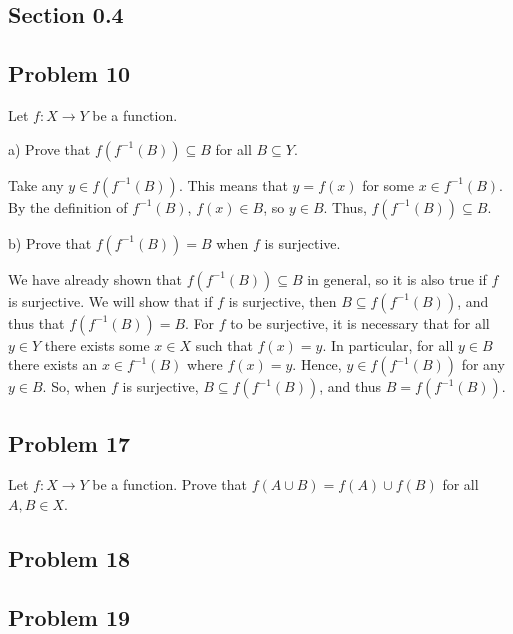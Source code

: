 \documentclass[11pt]{article}
\begin{document}
\subsection*{Section 0.4}
\subsection*{Problem 10}

Let $f: X \to Y$ be a function.

a) Prove that $f(f^{-1}(B)) \subseteq B$ for all $B \subseteq Y$.

Take any $y \in f(f^{-1}(B))$. This means that $y=f(x)$ for some $x \in f^{-1}(B)$.
By the definition of $f^{-1}(B)$, $f(x) \in B$, so $y \in B$. Thus,
$f(f^{-1}(B)) \subseteq B$. 

b) Prove that $f(f^{-1}(B)) = B$ when $f$ is surjective.

We have already shown that $f(f^{-1}(B)) \subseteq B$ in general, so it is also true
if $f$ is surjective. We will show that if $f$ is surjective, then 
$B \subseteq f(f^{-1}(B))$, and thus that $f(f^{-1}(B)) = B$. For $f$ to be surjective,
it is necessary that for all $y \in Y$ there exists some $x \in X$ such that $f(x) = y$.
In particular, for all $y \in B$ there exists an $x \in f^{-1}(B)$ where $f(x) = y$.
Hence, $y \in f(f^{-1}(B))$ for any $y \in B$. So, when $f$ is surjective,
$B \subseteq f(f^{-1}(B))$, and thus $B = f(f^{-1}(B))$.

\subsection*{Problem 17}

Let $f: X \to Y$ be a function. Prove that $f(A\cup B) = f(A) \cup f(B)$ for all
$A, B \in X$.

\subsection*{Problem 18}
\subsection*{Problem 19}
\end{document}
